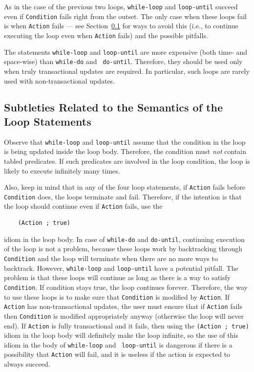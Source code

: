 \documentclass[11pt]{article}
\begin{document}
As in the case of the previous two loops, {\tt while-loop} and
{\tt loop-until} succeed even if {\tt Condition} fails right from the
outset. The only case when these loops fail is when {\tt Action} fails ---
see Section~\ref{sec-updates-pitfalls} for ways to avoid this (i.e.,
to continue executing the loop even when {\tt Action} fails) and the
possible pitfalls.


The statements {\tt while-loop} and {\tt loop-until} are more
expensive (both time- and space-wise) than {\tt while-do} and {\tt
  do-until}. Therefore, they should be used only when truly transactional
updates are required. In particular, such loops are rarely used with
non-transactional updates.


\subsection{Subtleties Related to the Semantics of the Loop Statements}
\label{sec-updates-pitfalls}

Observe that {\tt while-loop} and {\tt loop-until} assume that the
condition in the loop is being updated inside the loop body.  Therefore,
the condition must \emph{not} contain tabled predicates.  If such
predicates are involved in the loop condition, the loop is likely to
execute infinitely many times.

Also, keep in mind that in any of the four loop statements, if {\tt Action}
fails before {\tt Condition} does, the loops terminate and fail. Therefore,
if the intention is that the loop should continue even if {\tt Action}
fails, use the
\begin{verbatim}
    (Action ; true)  
\end{verbatim}
idiom in the loop body. In case of {\tt while-do} and {\tt do-until},
continuing execution of the loop is not a problem, because these loops work
by backtracking through {\tt Condition} and the loop will terminate when
there are no more ways to backtrack. However, {\tt while-loop}
and {\tt loop-until}  have a potential pitfall. The problem is that
these loops will continue as long as there is a way to satisfy {\tt
  Condition}.  If condition stays true, the loop continues forever.
Therefore, the way to use these loops is to make sure that {\tt Condition}
is modified by {\tt Action}. If {\tt Action} has non-transactional updates,
the user must ensure that if {\tt Action} fails then {\tt Condition} is
modified appropriately anyway (otherwise the loop will never end).
If {\tt Action} is fully transactional and it fails, then using the
{\tt (Action ; true)} idiom in the loop body will definitely make the loop
infinite, so the use of this idiom in the body of {\tt while-loop} and {\tt
  loop-until} is dangerous if there is a possibility that {\tt Action} will
fail, and it is useless if the action is expected to always succeed.
\end{document}
